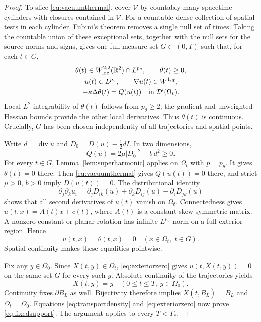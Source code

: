 \documentclass[11pt,letterpaper]{article}
\numberwithin{equation}{section}
\theoremstyle{definition}
\newcommand{\R}{\mathbb R}
\newcommand{\Div}{\operatorname{div}}
\begin{document}
\begin{proof}
To slice \eqref{eq:vacuumthermal}, cover $\mathcal V$ by countably
many spacetime cylinders with closures contained in $\mathcal V$.
For a countable dense collection of spatial tests in each cylinder,
Fubini's theorem removes a single null set of times. Taking the
countable union of these exceptional sets, together with the null
sets for the source norms and signs, gives one full-measure set
$G\subset(0,T)$ such that, for each $t\in G$,
\begin{equation}
 \begin{gathered}
 \theta(t)\in W^{2,2}_{\mathrm{loc}}(\R^2)\cap L^{p_\theta},
       \qquad \theta(t)\ge0,\\
 u(t)\in L^{p_u},\qquad \nabla u(t)\in W^{1,q},\\
 -\kappa\Delta\theta(t)=Q(u(t))
       \quad\hbox{in }\mathcal D'(\Omega_t).
 \end{gathered}\label{eq:commontimes}
\end{equation}
Local $L^2$ integrability of $\theta(t)$ follows from $p_\theta\ge2$;
the gradient and unweighted Hessian bounds provide the other local
derivatives. Thus $\theta(t)$ is continuous. Crucially, $G$ has been
chosen independently of all trajectories and spatial points.

Write $d=\Div u$ and $D_0=D(u)-\tfrac12dI$. In two dimensions,
\begin{equation}
 Q(u)=2\mu|D_0|^2+b\,d^2\ge0.
 \label{eq:positiveQ}
\end{equation}
For every $t\in G$, Lemma~\ref{lem:superharmonic} applies on
$\Omega_t$ with $p=p_\theta$. It gives $\theta(t)=0$ there.
Then \eqref{eq:vacuumthermal} gives $Q(u(t))=0$ there, and strict
$\mu>0$, $b>0$ imply $D(u(t))=0$. The distributional identity
\begin{equation}
 \partial_j\partial_k u_i
   =\partial_j D_{ik}(u)+\partial_k D_{ij}(u)
                         -\partial_i D_{jk}(u)
 \label{eq:rigididentity}
\end{equation}
shows that all second derivatives of $u(t)$ vanish on $\Omega_t$.
Connectedness gives $u(t,x)=A(t)x+c(t)$, where $A(t)$ is a constant
skew-symmetric matrix. A nonzero constant or planar rotation has
infinite $L^{p_u}$ norm on a full exterior region. Hence
\begin{equation}
 u(t,x)=\theta(t,x)=0
       \quad(x\in\Omega_t,\ t\in G).
 \label{eq:exteriorzero}
\end{equation}
Spatial continuity makes these equalities pointwise.

Fix any $y\in\Omega_0$. Since $X(t,y)\in\Omega_t$,
\eqref{eq:exteriorzero} gives $u(t,X(t,y))=0$ on the same set $G$
for every such $y$. Absolute continuity of the trajectories yields
\[
 X(t,y)=y\quad(0\le t\le T,\ y\in\Omega_0).
\]
Continuity fixes $\partial B_L$ as well. Bijectivity therefore implies
$X(t,\overline{B_L})=\overline{B_L}$ and $\Omega_t=\Omega_0$.
Equations \eqref{eq:transportdensity} and \eqref{eq:exteriorzero}
now prove \eqref{eq:fixedsupport}. The argument applies to every
$T<T_*$.
\end{proof}
\end{document}
